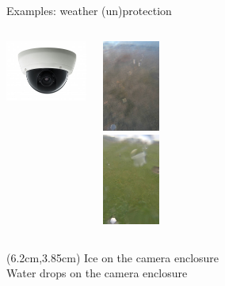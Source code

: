 \documentclass[10pt,fleqn]{beamer}\usepackage[]{graphicx}\usepackage[]{color}
\begin{document}
\begin{frame}{Examples: weather (un)protection}%
\begin{columns}
\includegraphics[height=2cm]{figure/wideCamera}

\includegraphics[height=3cm]{inst/extdata/cornerCasesTwente/EHTW_201506280400.jpg} \\
\includegraphics[height=3cm]{inst/extdata/cornerCasesTwente/EHTW_201510060700.jpg} \\

\end{columns}
\begin{textblock*}{5cm}(6.2cm,3.85cm)
Ice on the camera enclosure\\
\vspace{2.7cm}
Water drops on the camera enclosure
\end{textblock*}



\end{frame}
















\end{document}
